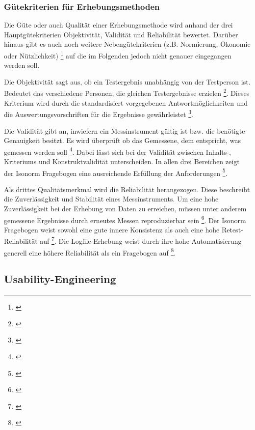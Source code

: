 
\subsubsection{Gütekriterien für Erhebungsmethoden}

Die Güte oder auch Qualität einer Erhebungsmethode wird anhand der drei Hauptgütekriterien Objektivität, Validität und Reliabilität bewertet. Darüber hinaus gibt es auch noch weitere Nebengütekriterien (z.B. Normierung, Ökonomie oder Nützlichkeit) \footnote{\cite[vgl.][Kap. 3.5]{Figl2010}} auf die im Folgenden jedoch nicht genauer eingegangen werden soll.

Die Objektivität sagt aus, ob ein Testergebnis unabhängig von der Testperson ist. Bedeutet das verschiedene Personen, die gleichen Testergebnisse erzielen \footnote{\cite[vgl.][Kap. 1]{Himme2007}}. Dieses Kriterium wird durch die standardisiert vorgegebenen Antwortmöglichkeiten und die Auswertungsvorschriften für die Ergebnisse gewährleistet \footnote{\cite[vgl.][Kap. 3.5.1]{Figl2010}}.

Die Validität gibt an, inwiefern ein Messinstrument gültig ist bzw. die benötigte Genauigkeit besitzt. Es wird überprüft ob das Gemessene, dem entspricht, was gemessen werden soll \footnote{\cite[vgl][Kap. 1]{Himme2007}}. Dabei lässt sich bei der Validität zwischen Inhalts-, Kriteriums und Konstruktvalidität unterscheiden. In allen drei Bereichen zeigt der Isonorm Fragebogen eine ausreichende Erfüllung der Anforderungen \footnote{\cite[vgl.][Kap. 3.5.2]{Figl2010}}.

Als drittes Qualitätsmerkmal wird die Reliabilität herangezogen. Diese beschreibt die Zuverlässigkeit und Stabilität eines Messinstruments. Um eine hohe Zuverlässigkeit bei der Erhebung von Daten zu erreichen, müssen unter anderem gemessene Ergebnisse durch erneutes Messen reproduzierbar sein \footnote{\cite[vgl.][Kap. 1]{Himme2007}}. Der Isonorm Fragebogen weist sowohl eine gute innere Konsistenz als auch eine hohe Retest-Reliabilität auf \footnote{\cite[vgl.][Kap. 3.5.3]{Figl2010}}. Die Logfile-Erhebung weist durch ihre hohe Automatisierung generell eine höhere Reliabilität als ein Fragebogen auf \footnote{\cite[vgl.][Kap. 65.3]{Baur2014}}.


\subsection{Usability-Engineering}
